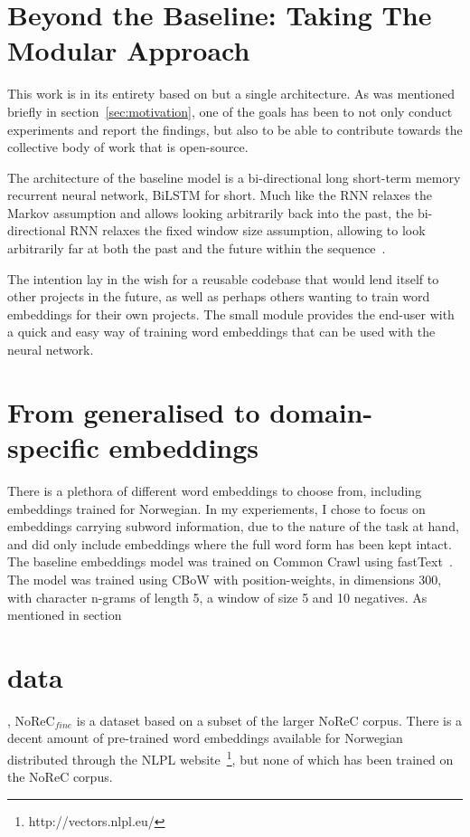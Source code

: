 \documentclass{acl2020}
\begin{document}
\section{Beyond the Baseline: Taking The Modular Approach}
\label{sec:codebase}

This work is in its entirety based on but a single architecture. As was mentioned briefly in section~\ref{sec:motivation}, one of the goals has been to not only conduct experiments and report the findings, but also to be able to contribute towards the collective body of work that is open-source.

The architecture of the baseline model is a bi-directional long short-term memory recurrent neural network, BiLSTM for short.
Much like the RNN relaxes the Markov assumption and allows looking arbitrarily back into the past, the bi-directional RNN relaxes the fixed window size assumption, allowing to look arbitrarily far at both the past and the future within the sequence~\citep{neural-nlp}.

The intention lay in the wish for a reusable codebase that would lend itself to other projects in the future, as well as perhaps others wanting to train word embeddings for their own projects. The small module provides the end-user with a quick and easy way of training word embeddings that can be used with the neural network.

\section{From generalised to domain-specific embeddings}
\label{sec:embeddings}

There is a plethora of different word embeddings to choose from, including embeddings trained for Norwegian. In my experiements, I chose to focus on embeddings carrying subword information, due to the nature of the task at hand, and did only include embeddings where the full word form has been kept intact. The baseline embeddings model was trained on Common Crawl using fastText~\citep{grave-etal-2018-learning}. The model was trained using CBoW with position-weights, in dimensions 300, with character n-grams of length 5, a window of size 5 and 10 negatives. As mentioned in section \section{data}, NoReC$_{fine}$ is a dataset based on a subset of the larger NoReC corpus. There is a decent amount of pre-trained word embeddings available for Norwegian distributed through the NLPL website~\footnote{http://vectors.nlpl.eu/}, but none of which has been trained on the NoReC corpus.
\end{document}
